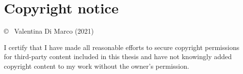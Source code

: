\section*{Copyright notice}

\vspace{1cm}

{
  \copyright ~ Valentina Di Marco (2021)
}

\vspace{1cm}

{
  I certify that I have made all reasonable efforts to secure
  copyright permissions for third-party content included in this
  thesis and have not knowingly added copyright content to my work
  without the owner's permission.
}
